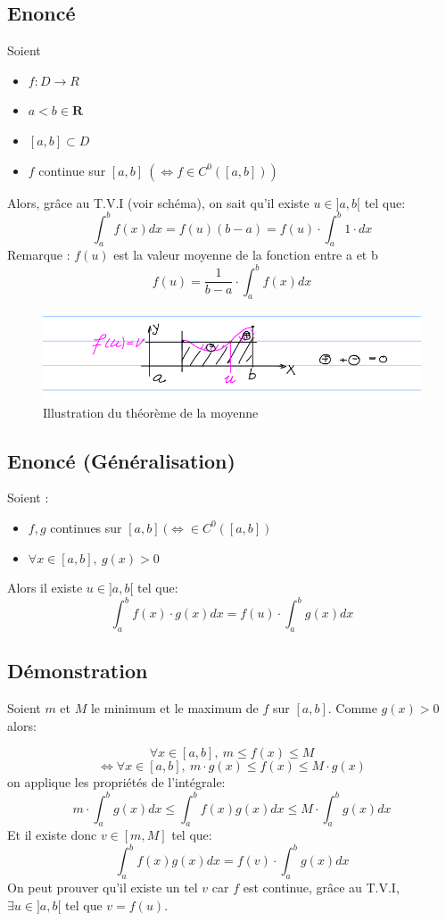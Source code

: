 \documentclass{article}
\begin{document}
\subsection{Enoncé}

Soient 

\begin{itemize}
    \item $ f: D \to R $
    \item $ a < b \in \mathbf{R} $
    \item $ [a, b] \subset D $
    \item $ f $ continue sur $ [a, b]\ (\Leftrightarrow f \in C^0([a, b])) $
\end{itemize}
Alors, grâce au T.V.I (voir schéma), on sait qu'il existe $ u \in ]a, b[$ tel que:
\[ \int_{a}^bf(x)dx = f(u)(b - a) = f(u) \cdot \int_{a}^b 1\cdot dx \]
Remarque : $f(u)$ est la valeur moyenne de la fonction entre a et b
\[ f(u) = \frac{1}{b-a} \cdot \int_{a}^{b} f(x)dx \]
\begin{figure}[htp]
    \centering
    \includegraphics[width=0.8\linewidth]{Images/moyenne.png}
    \caption{Illustration du théorème de la moyenne}
    \label{fig:enter-label}
\end{figure}

\subsection{Enoncé (Généralisation)}

Soient :
\begin{itemize}
    \item $ f, g $ continues sur $ [a, b]\ (\Leftrightarrow \in C^0([a, b]) $
    \item $ \forall x \in [a, b],\  g(x) > 0 $
\end{itemize}
Alors il existe $ u \in ]a, b[ $ tel que:
\[ \int_{a}^b f(x)\cdot g(x)dx = f(u) \cdot \int_{a}^b g(x)dx \]

\newpage

\subsection{Démonstration}

Soient $ m $ et $ M $ le minimum et le maximum de $ f $ sur $ [a, b] $. Comme $ g(x) > 0 $ alors:

\[ \forall x \in [a, b],\ m \leq f(x) \leq M \]
\[ \Leftrightarrow \forall x \in [a, b],\ m \cdot g(x) \leq f(x) \leq M \cdot g(x) \]
on applique les propriétés de l'intégrale:
\[ m \cdot \int_{a}^b g(x)dx \leq \int_{a}^b f(x)g(x)dx \leq M \cdot \int_{a}^b g(x)dx \]
Et il existe donc $ v \in [m, M] $ tel que:
\[ \int_{a}^b f(x)g(x)dx = f(v) \cdot \int_{a}^b g(x)dx \]
On peut prouver qu'il existe un tel $ v $ car $ f $ est continue, grâce au T.V.I, $ \exists u \in ]a, b[ $ tel que $ v = f(u) $.
\end{document}
